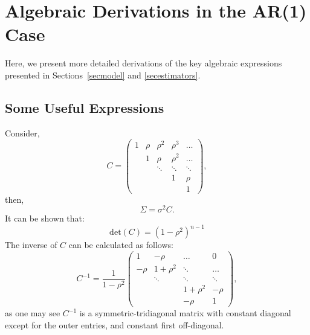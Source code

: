 \documentclass[11pt,a5paper,twoside]{book}
\begin{document}
{\setcounter{equation}{0}
\section{Algebraic Derivations in the AR(1) Case\label{ar1appendix}}

Here, we present more detailed derivations of the key algebraic expressions presented in Sections~\ref{secmodel} and \ref{secestimators}.


\subsection{Some Useful Expressions}\label{suppexp}

Consider,
\begin{equation}
\label{C}
C =
 \begin{pmatrix}
  1 & \rho & \rho^2 & \rho^3&\ldots \\
   & 1 & \rho & \rho^2 &\ldots \\
   &   & \ddots & \ddots &\ddots  \\
   & & & 1 & \rho\\
   &  & & & 1
 \end{pmatrix},
\end{equation}
then,
\begin{equation}
\label{suppSigma}
\Sigma= \sigma^2 C.
\end{equation}
It can be shown that:
\begin{equation}
\label{det_C}
\mathrm{det}(C)=\left(1-\rho^2 \right)^{n-1}
\end{equation}
The inverse of $C$ can be calculated as follows:
\begin{equation}
\label{inv_C}
C^{-1} =\frac{1}{1-\rho^2}
 \begin{pmatrix}
  1 & -\rho & \ldots & 0 \\
  -\rho & 1+\rho^2 & \ddots & \ldots \\
   &   \ddots & \ddots &\ddots  \\
   &  & 1+\rho^2& -\rho\\
   &   &-\rho& 1
 \end{pmatrix},
\end{equation}
as one may see $C^{-1}$ is a symmetric-tridiagonal matrix with constant diagonal except for the outer entries, and constant first off-diagonal.

}
\end{document}
